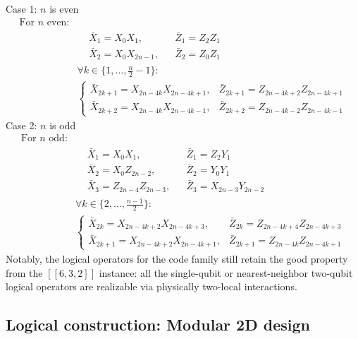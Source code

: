 \documentclass[%
10pt,tightenlines,
superscriptaddress,
 amsmath,amssymb,
 aps,
pra,
]{revtex4-2}
\begin{document}
Case 1: $n$ is even$$\begin{aligned}
\text{For } n \text{ even:} \\
&\begin{aligned}
    &\bar{X}_1 = X_{0}X_1, && \bar{Z}_1 = Z_2Z_1 \\
    &\bar{X}_2 = X_0X_{2n-1}, && \bar{Z}_2 = Z_0Z_1 
\end{aligned} \\[8pt]
&\forall k \in \{1,\dots,\tfrac{n}{2}-1\}: \\
&\begin{cases}
    \bar{X}_{2k+1} = X_{2n-4k}X_{2n-4k+1}, & \bar{Z}_{2k+1} = Z_{2n-4k+2}Z_{2n-4k+1} \\
    \bar{X}_{2k+2} = X_{2n-4k}X_{2n-4k-1}, & \bar{Z}_{2k+2} = Z_{2n-4k-2}Z_{2n-4k-1}
\end{cases}
\end{aligned}$$Case 2: $n$ is odd$$\begin{aligned}
\text{For } n \text{ odd:} \\
&\begin{aligned}
    &\bar{X}_1 = X_0X_1, && \bar{Z}_1 = Z_2Y_1 \\
    &\bar{X}_2 = X_0Z_{2n-2}, && \bar{Z}_2 = Y_0Y_1 \\
    &\bar{X}_3 = Z_{2n-4}Z_{2n-3}, && \bar{Z}_3 = X_{2n-3}Y_{2n-2}
\end{aligned} \\[8pt]
&\forall k \in \{2,\dots,\tfrac{n-1}{2}\}: \\
&\begin{cases}
    \bar{X}_{2k} = X_{2n-4k+2}X_{2n-4k+3}, & \bar{Z}_{2k} = Z_{2n-4k+4}Z_{2n-4k+3} \\
    \bar{X}_{2k+1} = X_{2n-4k+2}X_{2n-4k+1}, & \bar{Z}_{2k+1} = Z_{2n-4k}Z_{2n-4k+1}
\end{cases}
\end{aligned}$$
Notably, the logical operators for the code family still retain the good property from the $[[6,3,2]]$ instance: all the single-qubit or nearest-neighbor two-qubit logical operators are realizable via physically two-local interactions. 

\subsection{Logical construction: Modular 2D design}
\end{document}
